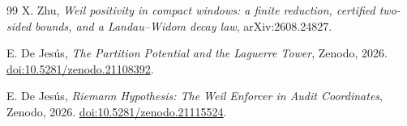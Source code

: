 \documentclass[11pt,a4paper]{article}
\theoremstyle{definition}
\theoremstyle{remark}
\begin{document}
\begin{thebibliography}{99}
 X. Zhu,
\emph{Weil positivity in compact windows: a finite reduction, certified two-sided bounds,
and a Landau--Widom decay law}, arXiv:2608.24827.

 E. De Jes\'us,
\emph{The Partition Potential and the Laguerre Tower}, Zenodo, 2026.
\href{https://doi.org/10.5281/zenodo.21108392}{doi:10.5281/zenodo.21108392}.

 E. De Jes\'us,
\emph{Riemann Hypothesis: The Weil Enforcer in Audit Coordinates}, Zenodo, 2026.
\href{https://doi.org/10.5281/zenodo.21115524}{doi:10.5281/zenodo.21115524}.

\end{thebibliography}
\end{document}
